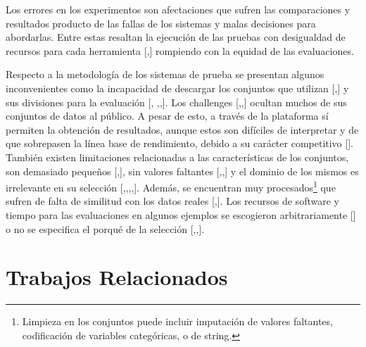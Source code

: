 Los errores en los experimentos son afectaciones que sufren las comparaciones y resultados producto de las fallas de los sistemas y malas decisiones para abordarlas. 
Entre estas resaltan la ejecución de las pruebas con desigualdad de recursos para cada herramienta [\cite{10},\cite{25}] rompiendo con la equidad de las evaluaciones.

Respecto a la metodología de los sistemas de prueba se presentan algunos inconvenientes como la incapacidad de descargar los conjuntos que utilizan [\cite{14},\cite{32}] y 
sus divisiones para la evaluación [\cite{10}, \cite{14},\cite{16},\cite{34}]. Los challenges [\cite{11},\cite{12},\cite{29}] ocultan muchos de sus conjuntos de datos 
al público. A pesar de esto, a través de la plataforma sí permiten la obtención de resultados, aunque estos son difíciles de interpretar y de que sobrepasen la línea 
base de rendimiento, debido a su carácter competitivo [\cite{31}]. También existen limitaciones relacionadas a las características de los conjuntos, son demasiado pequeños 
[\cite{15},\cite{23}], sin valores faltantes [\cite{18},\cite{24},\cite{25}] y el dominio de los mismos es irrelevante en su selección 
[\cite{10},\cite{16},\cite{18},\cite{22},\cite{31}]. Además, se encuentran muy procesados\footnote{Limpieza en los conjuntos puede incluir imputación de valores 
faltantes, codificación de variables categóricas, o de string.} que sufren de falta de similitud con los datos reales [\cite{18},\cite{22}]. Los recursos de software y 
tiempo para las evaluaciones en algunos ejemplos se escogieron arbitrariamente [\cite{8}] o no se especifica el porqué de la selección [\cite{13},\cite{22},\cite{24}].

\section{Trabajos Relacionados}\label{section:trabajos_relacionados}


